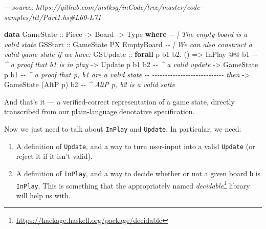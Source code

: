 \documentclass[]{article}
\newenvironment{Shaded}{}{}
\newcommand{\CommentTok}[1]{\textcolor[rgb]{0.38,0.63,0.69}{\textit{#1}}}
\newcommand{\DataTypeTok}[1]{\textcolor[rgb]{0.56,0.13,0.00}{#1}}
\newcommand{\KeywordTok}[1]{\textcolor[rgb]{0.00,0.44,0.13}{\textbf{#1}}}
\newcommand{\NormalTok}[1]{#1}
\newcommand{\OperatorTok}[1]{\textcolor[rgb]{0.40,0.40,0.40}{#1}}
\newcommand{\OtherTok}[1]{\textcolor[rgb]{0.00,0.44,0.13}{#1}}
\renewcommand{\href}[2]{#2\footnote{\url{#1}}}
\begin{document}
\begin{Shaded}
\begin{Highlighting}[]
\CommentTok{{-}{-} source: https://github.com/mstksg/inCode/tree/master/code{-}samples/ttt/Part1.hs\#L60{-}L71}

\KeywordTok{data} \DataTypeTok{GameState}\OtherTok{ ::} \DataTypeTok{Piece} \OtherTok{{-}>} \DataTypeTok{Board} \OtherTok{{-}>} \DataTypeTok{Type} \KeywordTok{where}
    \CommentTok{{-}{-} | The empty board is a valid state}
    \DataTypeTok{GSStart}
\OtherTok{        ::} \DataTypeTok{GameState} \DataTypeTok{\textquotesingle{}PX} \DataTypeTok{EmptyBoard}
    \CommentTok{{-}{-} | We can also construct a valid game state if we have:}
    \DataTypeTok{GSUpdate}
\OtherTok{        ::} \KeywordTok{forall}\NormalTok{ p b1 b2}\OperatorTok{.}\NormalTok{ ()}
        \OtherTok{=>} \DataTypeTok{InPlay}          \OperatorTok{@@}\NormalTok{ b1     }\CommentTok{{-}{-} \^{} a proof that b1 is in play}
        \OtherTok{{-}>} \DataTypeTok{Update}\NormalTok{    p        b1 b2  }\CommentTok{{-}{-} \^{} a valid update}
        \OtherTok{{-}>} \DataTypeTok{GameState}\NormalTok{ p        b1     }\CommentTok{{-}{-} \^{} a proof that p, b1 are a valid state}
        \CommentTok{{-}{-} {-}{-}{-}{-}{-}{-}{-}{-}{-}{-}{-}{-}{-}{-}{-}{-}{-}{-}{-}{-}{-}{-}{-}{-}{-}{-}{-}{-} then}
        \OtherTok{{-}>} \DataTypeTok{GameState}\NormalTok{ (}\DataTypeTok{AltP}\NormalTok{ p)    b2  }\CommentTok{{-}{-} \^{} \textasciigrave{}AltP p\textasciigrave{}, b2 is a valid satte}
\end{Highlighting}
\end{Shaded}

And that's it --- a verified-correct representation of a game state, directly
transcribed from our plain-language denotative specification.

Now we just need to talk about \texttt{InPlay} and \texttt{Update}. In
particular, we need:

\begin{enumerate}
\def\labelenumi{\arabic{enumi}.}
\tightlist
\item
  A definition of \texttt{Update}, and a way to turn user-input into a valid
  \texttt{Update} (or reject it if it isn't valid).
\item
  A definition of \texttt{InPlay}, and a way to decide whether or not a given
  board \texttt{b} is \texttt{InPlay}. This is something that the appropriately
  named \emph{\href{https://hackage.haskell.org/package/decidable}{decidable}}
  library will help us with.
\end{enumerate}
\end{document}
